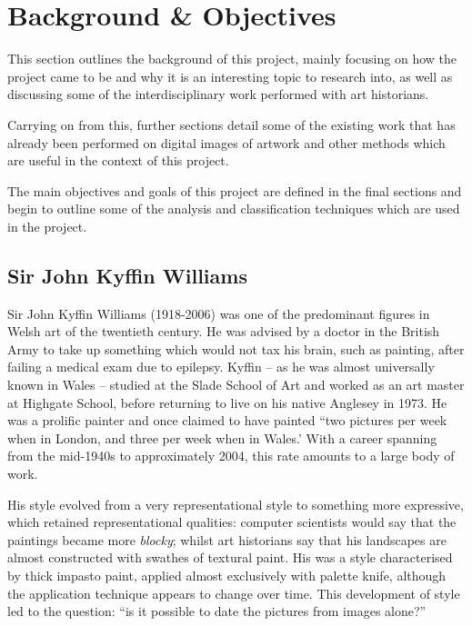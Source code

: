 \chapter{Background \& Objectives}


This section outlines the background of this project, mainly focusing on how the project came to
be and why it is an interesting topic to research into, as well as discussing some of the 
interdisciplinary work performed with art historians.

Carrying on from this, further sections detail some of the existing work that has already been 
performed on digital images of artwork and other methods which are useful in the context of this
project.

The main objectives and goals of this project are defined in the final sections and begin to
outline some of the analysis and classification techniques which are used in the project.

\section{Sir John Kyffin Williams}

Sir John Kyffin Williams (1918-2006) was one of the predominant figures in Welsh art of the
twentieth century.  He was advised by a doctor in the British Army to take up something which
would not tax his brain, such as painting, after failing a medical exam due to epilepsy. Kyffin --
as he was almost universally known in Wales -- studied at the Slade School of Art and worked as an
art master at Highgate School, before returning to live on his native Anglesey in 1973.  He was a
prolific painter and once claimed to have painted ``two pictures per week when in London, and 
three per week when in Wales.'\cite[p.209]{Williams1993Across} With a career spanning from the 
mid-1940s to approximately 2004, this rate amounts to a large body of work.

His style evolved from a very representational style to something more
expressive, which retained representational qualities: computer scientists
would say that the paintings became more \emph{blocky}; whilst art
historians say that his landscapes are almost constructed with swathes of textural
paint. His was a style characterised by thick impasto paint, applied almost
exclusively with palette knife, although the application technique appears to
change over time. This development of style led to the question: ``is it possible to
date the pictures from images alone?''

